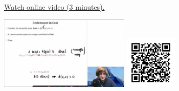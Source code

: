 
\begin{minipage}{10cm}
    \href{https://act4e-spring21.netlify.app/videos/spring2021-enrichment:cost-en.html}{Watch online video (3 minutes).}
        
    \href{https://act4e-spring21.netlify.app/videos/spring2021-enrichment:cost-en.html}{\includegraphics[height=3.5cm]{spring2021-enrichment:cost-en/thumbnails.jpg}}
    \href{https://act4e-spring21.netlify.app/videos/spring2021-enrichment:cost-en.html}{\includegraphics[height=2.5cm]{spring2021-enrichment:cost-en/qrcode.png}}
\end{minipage}

